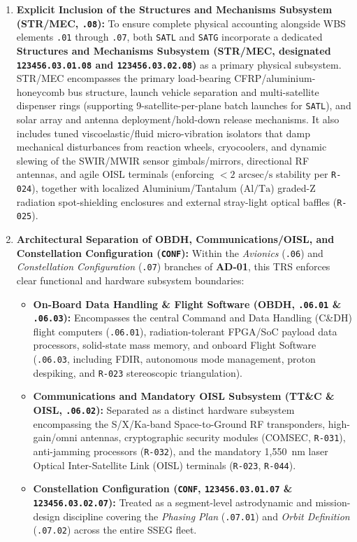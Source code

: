 \documentclass[11pt,a4paper]{article}
\providecommand{\abbr}[1]{#1}
\begin{document}
\begin{enumerate}
    \item \textbf{Explicit Inclusion of the Structures and Mechanisms Subsystem (\abbr{STR/MEC}, \texttt{.08}):} To ensure complete physical accounting alongside WBS elements \texttt{.01} through \texttt{.07}, both \texttt{SATL} and \texttt{SATG} incorporate a dedicated \textbf{Structures and Mechanisms Subsystem (\abbr{STR/MEC}, designated \texttt{123456.03.01.08} and \texttt{123456.03.02.08})} as a primary physical subsystem. \abbr{STR/MEC} encompasses the primary load-bearing CFRP/aluminium-honeycomb bus structure, launch vehicle separation and multi-satellite dispenser rings (supporting 9-satellite-per-plane batch launches for \texttt{SATL}), and solar array and antenna deployment/hold-down release mechanisms. It also includes tuned viscoelastic/fluid micro-vibration isolators that damp mechanical disturbances from reaction wheels, cryocoolers, and dynamic slewing of the \abbr{SWIR}/\abbr{MWIR} sensor gimbals/mirrors, directional \abbr{RF} antennas, and agile \abbr{OISL} terminals (enforcing $< 2\text{ arcsec/s}$ stability per \texttt{R-024}), together with localized Aluminium/Tantalum ($\mathrm{Al}/\mathrm{Ta}$) graded-Z radiation spot-shielding enclosures and external stray-light optical baffles (\texttt{R-025}).
    \item \textbf{Architectural Separation of \abbr{OBDH}, Communications/\abbr{OISL}, and Constellation Configuration (\texttt{CONF}):} Within the \emph{Avionics} (\texttt{.06}) and \emph{Constellation Configuration} (\texttt{.07}) branches of \textbf{AD-01}, this \abbr{TRS} enforces clear functional and hardware subsystem boundaries:
    \begin{itemize}
        \item \textbf{On-Board Data Handling \& Flight Software (\abbr{OBDH}, \texttt{.06.01} \& \texttt{.06.03}):} Encompasses the central Command and Data Handling (\abbr{C\&DH}) flight computers (\texttt{.06.01}), radiation-tolerant FPGA/SoC payload data processors, solid-state mass memory, and onboard Flight Software (\texttt{.06.03}, including \abbr{FDIR}, autonomous mode management, proton despiking, and \texttt{R-023} stereoscopic triangulation).
        \item \textbf{Communications and Mandatory \abbr{OISL} Subsystem (\abbr{TT\&C} \& \abbr{OISL}, \texttt{.06.02}):} Separated as a distinct hardware subsystem encompassing the S/X/Ka-band Space-to-Ground \abbr{RF} transponders, high-gain/omni antennas, cryptographic security modules (\abbr{COMSEC}, \texttt{R-031}), anti-jamming processors (\texttt{R-032}), and the mandatory 1,550~nm laser Optical Inter-Satellite Link (\abbr{OISL}) terminals (\texttt{R-023}, \texttt{R-044}).
        \item \textbf{Constellation Configuration (\texttt{CONF}, \texttt{123456.03.01.07} \& \texttt{123456.03.02.07}):} Treated as a segment-level astrodynamic and mission-design discipline covering the \emph{Phasing Plan} (\texttt{.07.01}) and \emph{Orbit Definition} (\texttt{.07.02}) across the entire \abbr{SSEG} fleet.
    \end{itemize}
\end{enumerate}
\end{document}
